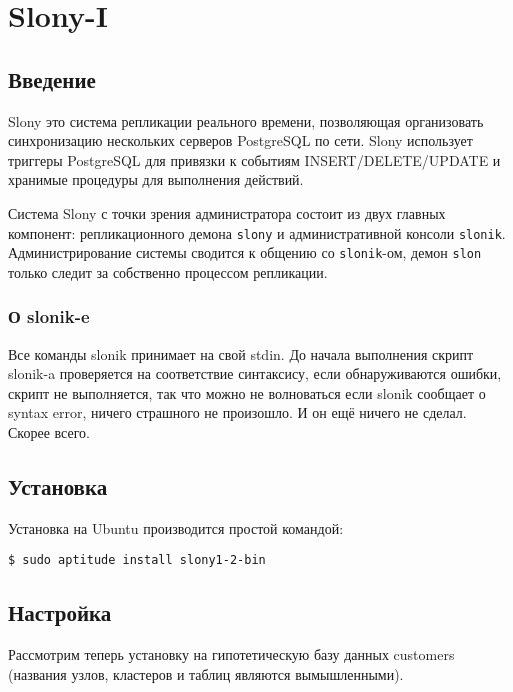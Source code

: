 \section{Slony-I}
\label{sec:slonyI}

\subsection{Введение}

Slony это система репликации реального времени, позволяющая организовать синхронизацию нескольких серверов PostgreSQL по сети. Slony использует триггеры PostgreSQL для привязки к событиям INSERT/DELETE/UPDATE и хранимые процедуры для выполнения действий.

Система Slony с точки зрения администратора состоит из двух главных компонент: репликационного демона \lstinline!slony! и административной консоли \lstinline!slonik!. Администрирование системы сводится к общению со \lstinline!slonik!-ом, демон \lstinline!slon! только следит за собственно процессом репликации.

\subsubsection{О slonik-e}

Все команды slonik принимает на свой stdin. До начала выполнения скрипт slonik-a проверяется на соответствие синтаксису, если обнаруживаются ошибки, скрипт не выполняется, так что можно не волноваться если slonik сообщает о syntax error, ничего страшного не произошло. И он ещё ничего не сделал. Скорее всего.

\subsection{Установка}

Установка на Ubuntu производится простой командой:

\begin{lstlisting}[label=lst:slony1,caption=Установка]
$ sudo aptitude install slony1-2-bin
\end{lstlisting}

\subsection{Настройка}
\label{subsec:slonyI-settings}

Рассмотрим теперь установку на гипотетическую базу данных customers (названия узлов, кластеров и таблиц являются вымышленными).

